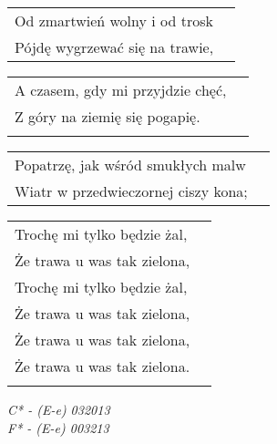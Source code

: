 \documentclass[a5paper]{article}
\begin{document}
\noindent
\begin{tabular}{@{}p{6.50cm}p{3cm}@{}}
Od zmartwień wolny i od trosk  & \\
Pójdę wygrzewać się na trawie,  & \\
\end{tabular}

\begin{tabular}{@{}p{6.50cm}p{3cm}@{}}
A czasem, gdy mi przyjdzie chęć, & \\
Z góry na ziemię się pogapię. & \\ \\
\end{tabular}
 
\noindent
\begin{tabular}{@{}p{6.50cm}p{3cm}@{}}
Popatrzę, jak wśród smukłych malw  & \\
Wiatr w przedwieczornej ciszy kona;  & \\
\end{tabular}

\begin{tabular}{@{}p{6.50cm}p{3cm}@{}}
	Trochę mi tylko będzie żal, & \\
	Że trawa u was tak zielona, & \\
	Trochę mi tylko będzie żal, & \\
	Że trawa u was tak zielona, & \\
	Że trawa u was tak zielona, & \\
	Że trawa u was tak zielona. & \\ \\
\end{tabular}

\noindent
\emph{C* - (E-e) 032013} \\
\emph{F* - (E-e) 003213}
\end{document}
